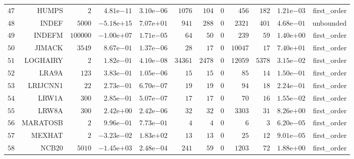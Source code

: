 \begin{longtable}{rrrrrrrrrrrr}
  \(    47\) & HUMPS & \(     2\) & \( 4.81\)e\(-11\) & \( 3.10\)e\(-06\) & \(  1076\) & \(   104\) & \(     0\) & \(   456\) & \(   182\) & \( 1.21\)e\(-03\) & first\_order \\
  \(    48\) & INDEF & \(  5000\) & \(-5.18\)e\(+15\) & \( 7.07\)e\(+01\) & \(   941\) & \(   288\) & \(     0\) & \(  2321\) & \(   401\) & \( 4.68\)e\(-01\) & unbounded \\
  \(    49\) & INDEFM & \(100000\) & \(-1.00\)e\(+07\) & \( 1.71\)e\(-05\) & \(    64\) & \(    50\) & \(     0\) & \(   239\) & \(    59\) & \( 1.40\)e\(+00\) & first\_order \\
  \(    50\) & JIMACK & \(  3549\) & \( 8.67\)e\(-01\) & \( 1.37\)e\(-06\) & \(    28\) & \(    17\) & \(     0\) & \( 10047\) & \(    17\) & \( 7.40\)e\(+01\) & first\_order \\
  \(    51\) & LOGHAIRY & \(     2\) & \( 1.82\)e\(-01\) & \( 4.10\)e\(-08\) & \( 34361\) & \(  2478\) & \(     0\) & \( 12059\) & \(  5378\) & \( 3.15\)e\(-02\) & first\_order \\
  \(    52\) & LRA9A & \(   123\) & \( 3.83\)e\(-01\) & \( 1.05\)e\(-06\) & \(    15\) & \(    15\) & \(     0\) & \(    85\) & \(    14\) & \( 1.50\)e\(-01\) & first\_order \\
  \(    53\) & LRIJCNN1 & \(    22\) & \( 2.73\)e\(-01\) & \( 6.70\)e\(-07\) & \(    19\) & \(    19\) & \(     0\) & \(    94\) & \(    18\) & \( 2.24\)e\(-01\) & first\_order \\
  \(    54\) & LRW1A & \(   300\) & \( 2.85\)e\(-01\) & \( 5.07\)e\(-07\) & \(    17\) & \(    17\) & \(     0\) & \(    70\) & \(    16\) & \( 1.55\)e\(-02\) & first\_order \\
  \(    55\) & LRW8A & \(   300\) & \( 2.42\)e\(+00\) & \( 2.42\)e\(-06\) & \(    32\) & \(    32\) & \(     0\) & \(  3303\) & \(    31\) & \( 8.26\)e\(+00\) & first\_order \\
  \(    56\) & MARATOSB & \(     2\) & \( 9.96\)e\(-01\) & \( 7.73\)e\(-01\) & \(     4\) & \(     4\) & \(     0\) & \(     6\) & \(     3\) & \( 6.20\)e\(-05\) & first\_order \\
  \(    57\) & MEXHAT & \(     2\) & \(-3.23\)e\(-02\) & \( 1.83\)e\(+02\) & \(    13\) & \(    13\) & \(     0\) & \(    25\) & \(    12\) & \( 9.01\)e\(-05\) & first\_order \\
  \(    58\) & NCB20 & \(  5010\) & \(-1.45\)e\(+03\) & \( 2.48\)e\(-04\) & \(   241\) & \(    59\) & \(     0\) & \(  1203\) & \(    72\) & \( 1.88\)e\(+00\) & first\_order \\

\end{longtable}
